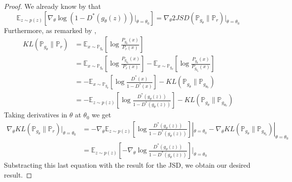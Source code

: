 \documentclass{article} %
\newcommand\EE{\mathbb{E}}
\newcommand\PP{\mathbb{P}}
\theoremstyle{definition}
\begin{document}
\begin{proof}
We already know by \cite{Good-ea-GAN} that %
$$ \EE_{z \sim p(z)} \left[\nabla_\theta \log(1 - D^*(g_\theta(z)))|_{\theta=\theta_0}\right] = 
  \nabla_\theta 2 JSD(\PP_{g_\theta} \| \PP_r)|_{\theta=\theta_0} $$
Furthermore, as remarked by \cite{Ferenc-blogpost},
\begin{align*}
 KL(\PP_{g_\theta} \| \PP_r) &= \EE_{x \sim \PP_{g_\theta}} \left[ \log \frac{P_{g_\theta}(x)}
  {P_r(x)} \right] \\
 &= \EE_{x \sim \PP_{g_\theta}} \left[ \log \frac{P_{g_{\theta_0}}(x)} {P_r(x)} \right]
 - \EE_{x \sim \PP_{g_\theta}} \left[ \log \frac{P_{g_\theta}(x)} {P_{g_{\theta_0}}(x)} \right]\\
 &= -\EE_{x \sim \PP_{g_\theta}} \left[ \log \frac{D^*(x)}{1 - D^*(x)} \right] - KL(\PP_{g_\theta} 
  \| \PP_{g_{\theta_0}}) \\
 &= -\EE_{z \sim p(z)}\left[ \log \frac{D^*(g_\theta(z))}{1-D^*(g_\theta(z))}\right] - 
  KL(\PP_{g_\theta} \| \PP_{g_{\theta_0}})
\end{align*}
Taking derivatives in $\theta$ at $\theta_0$ we get
\begin{align*}
  \nabla_\theta KL(\PP_{g_\theta} \| \PP_r)|_{\theta=\theta_0} &= -\nabla_\theta
    \EE_{z \sim p(z)}\left[ \log \frac{D^*(g_\theta(z))}{1-D^*(g_\theta(z))}\right]|_{\theta=\theta_0}
    -\nabla_\theta KL(\PP_{g_\theta} \| \PP_{g_{\theta_0}})|_{\theta=\theta_0} \\
    &= \EE_{z \sim p(z)}\left[  -\nabla_\theta
\log \frac{D^*(g_\theta(z))}{1-D^*(g_\theta(z))}\right]|_{\theta=\theta_0}
\end{align*}
Substracting this last equation with the result for the JSD, we obtain our desired result.
\end{proof}
\end{document}
